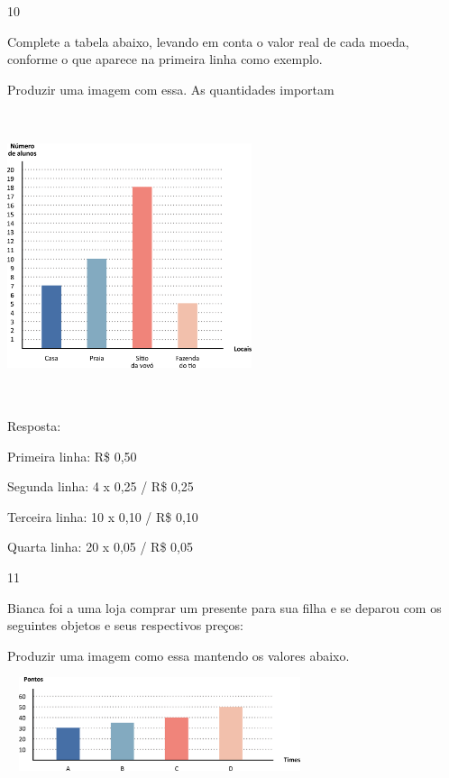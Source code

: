 
\num{10}

Complete a tabela abaixo, levando em conta o valor real de cada moeda,
conforme o que aparece na primeira linha como exemplo.

Produzir uma imagem com essa. As quantidades importam

\includegraphics[width=2.82051in,height=3.34367in]{media/image79.png}

Resposta:

Primeira linha: R\$ 0,50

Segunda linha: 4 x 0,25 / R\$ 0,25

Terceira linha: 10 x 0,10 / R\$ 0,10

Quarta linha: 20 x 0,05 / R\$ 0,05

\num{11}

Bianca foi a uma loja comprar um presente para sua filha e se deparou
com os seguintes objetos e seus respectivos preços:

Produzir uma imagem como essa mantendo os valores abaixo.

\includegraphics[width=3.51697in,height=1.08343in]{media/image80.png}

